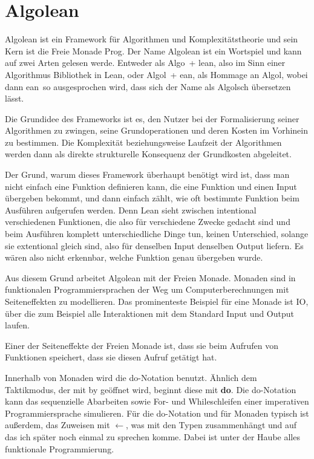 \section{Algolean}\label{Algolean}
Algolean\cite{algolean} ist ein Framework für Algorithmen und Komplexitätstheorie
und sein Kern ist die Freie Monade\cite{the_free_monad} Prog.
Der Name Algolean ist ein Wortspiel und kann auf zwei Arten gelesen werde.
Entweder als \glqq Algo\grqq ~+ \glqq lean\grqq, also im Sinn einer Algorithmus Bibliothek in Lean, oder \glqq Algol\grqq ~+ \glqq ean\grqq, als Hommage an Algol, wobei dann \glqq ean\grqq ~so ausgesprochen wird, dass sich der Name als Algolsch übersetzen lässt.

Die Grundidee des Frameworks ist es,
den Nutzer bei der Formalisierung seiner Algorithmen zu zwingen, seine Grundoperationen und deren Kosten im Vorhinein zu bestimmen.
Die Komplexität beziehungsweise Laufzeit der Algorithmen werden dann als direkte strukturelle Konsequenz der Grundkosten abgeleitet.

Der Grund, warum dieses Framework überhaupt benötigt wird ist, dass man nicht einfach eine Funktion definieren kann,
die eine Funktion und einen Input übergeben bekommt, und dann einfach zählt, wie oft bestimmte Funktion beim Ausführen aufgerufen werden.
Denn Lean sieht zwischen intentional verschiedenen Funktionen, die also für verschiedene Zwecke gedacht sind und beim Ausführen komplett unterschiedliche Dinge tun,
keinen Unterschied, solange sie extentional gleich sind, also für denselben Input denselben Output liefern.
Es wären also nicht erkennbar, welche Funktion genau übergeben wurde.

Aus diesem Grund arbeitet Algolean mit der Freien Monade.
Monaden sind in funktionalen Programmiersprachen der Weg um Computerberechnungen mit Seiteneffekten zu modellieren.
Das prominenteste Beispiel für eine Monade ist IO, über die zum Beispiel alle Interaktionen mit dem Standard Input und Output laufen.

Einer der Seiteneffekte der Freien Monade ist, dass sie beim Aufrufen von Funktionen speichert, dass sie diesen Aufruf getätigt hat.

Innerhalb von Monaden wird die do-Notation benutzt.
Ähnlich dem Taktikmodus, der mit by geöffnet wird, beginnt diese mit \textbf{do}.
Die do-Notation kann das sequenzielle Abarbeiten sowie For- und Whileschleifen einer imperativen Programmiersprache simulieren.
Für die do-Notation und für Monaden typisch ist außerdem, das Zuweisen mit $\leftarrow$, was mit den Typen zusammenhängt und auf das ich später noch einmal zu sprechen komme.
Dabei ist unter der Haube alles funktionale Programmierung.

